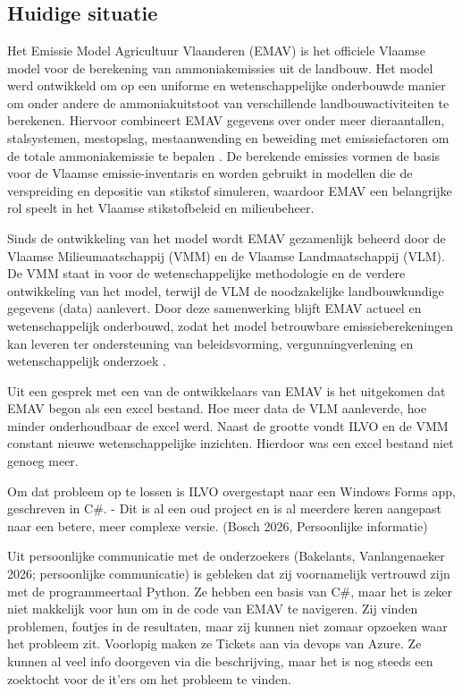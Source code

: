 \chapter{}
\label{ch:probleem_stelling}

\section{Huidige situatie}
Het Emissie Model Agricultuur Vlaanderen (EMAV) is het officiele Vlaamse model voor de berekening van ammoniakemissies uit de landbouw.
Het model werd ontwikkeld om op een uniforme en wetenschappelijke onderbouwde manier om onder andere de ammoniakuitstoot van verschillende landbouwactiviteiten te berekenen.
Hiervoor combineert EMAV gegevens over onder meer dieraantallen, stalsystemen, mestopslag, mestaanwending en beweiding met emissiefactoren om de totale ammoniakemissie te bepalen \autocite{DemeyerPEMAV}.
De berekende emissies vormen de basis voor de Vlaamse emissie-inventaris en worden gebruikt in modellen die de verspreiding en depositie van stikstof simuleren, waardoor EMAV een belangrijke rol speelt in het Vlaamse stikstofbeleid en milieubeheer.

Sinds de ontwikkeling van het model wordt EMAV gezamenlijk beheerd door de Vlaamse Milieumaatschappij (VMM) en de Vlaamse Landmaatschappij (VLM).
De VMM staat in voor de wetenschappelijke methodologie en de verdere ontwikkeling van het model, terwijl de VLM de noodzakelijke landbouwkundige gegevens (data) aanlevert.
Door deze samenwerking blijft EMAV actueel en wetenschappelijk onderbouwd, zodat het model betrouwbare emissieberekeningen kan leveren ter ondersteuning van beleidsvorming, vergunningverlening en wetenschappelijk onderzoek \autocite{vlm_vmm_2022_emav}.

Uit een gesprek met een van de ontwikkelaars van EMAV is het uitgekomen dat EMAV begon als een excel bestand.
Hoe meer data de VLM aanleverde, hoe minder onderhoudbaar de excel werd.
Naast de grootte vondt ILVO en de VMM constant nieuwe wetenschappelijke inzichten.
Hierdoor was een excel bestand niet genoeg meer.

Om dat probleem op te lossen is ILVO overgestapt naar een Windows Forms app, geschreven in C\#.
-
Dit is al een oud project en is al meerdere keren aangepast naar een betere, meer complexe versie. (Bosch 2026, Persoonlijke informatie)

Uit persoonlijke communicatie met de onderzoekers (Bakelants, Vanlangenaeker 2026; persoonlijke communicatie) is gebleken dat zij voornamelijk vertrouwd zijn met de programmeertaal Python.
Ze hebben een basis van C\#, maar het is zeker niet makkelijk voor hun om in de code van EMAV te navigeren.
Zij vinden problemen, foutjes in de resultaten, maar zij kunnen niet zomaar opzoeken waar het probleem zit.
Voorlopig maken ze Tickets aan via devops van Azure. Ze kunnen al veel info doorgeven via die beschrijving, maar het is nog steeds een zoektocht voor de it'ers om het probleem te vinden.

